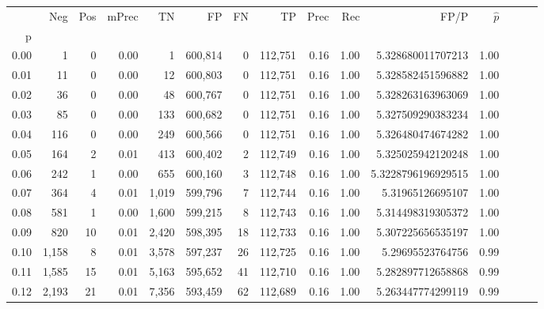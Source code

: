 \begin{tabular}{rrrrrrrrrrrrrrr}
\toprule
{} &     Neg &    Pos & mPrec &       TN &       FP &       FN &       TP &  Prec &   Rec &                    FP/P & $\hat{p}$ \\
p    &         &        &       &          &          &          &          &       &       &                         &           \\
\midrule
0.00 &       1 &      0 &  0.00 &        1 &  600,814 &        0 &  112,751 &  0.16 &  1.00 &       5.328680011707213 &      1.00 \\
0.01 &      11 &      0 &  0.00 &       12 &  600,803 &        0 &  112,751 &  0.16 &  1.00 &       5.328582451596882 &      1.00 \\
0.02 &      36 &      0 &  0.00 &       48 &  600,767 &        0 &  112,751 &  0.16 &  1.00 &       5.328263163963069 &      1.00 \\
0.03 &      85 &      0 &  0.00 &      133 &  600,682 &        0 &  112,751 &  0.16 &  1.00 &       5.327509290383234 &      1.00 \\
0.04 &     116 &      0 &  0.00 &      249 &  600,566 &        0 &  112,751 &  0.16 &  1.00 &       5.326480474674282 &      1.00 \\
0.05 &     164 &      2 &  0.01 &      413 &  600,402 &        2 &  112,749 &  0.16 &  1.00 &       5.325025942120248 &      1.00 \\
0.06 &     242 &      1 &  0.00 &      655 &  600,160 &        3 &  112,748 &  0.16 &  1.00 &      5.3228796196929515 &      1.00 \\
0.07 &     364 &      4 &  0.01 &    1,019 &  599,796 &        7 &  112,744 &  0.16 &  1.00 &        5.31965126695107 &      1.00 \\
0.08 &     581 &      1 &  0.00 &    1,600 &  599,215 &        8 &  112,743 &  0.16 &  1.00 &       5.314498319305372 &      1.00 \\
0.09 &     820 &     10 &  0.01 &    2,420 &  598,395 &       18 &  112,733 &  0.16 &  1.00 &       5.307225656535197 &      1.00 \\
0.10 &   1,158 &      8 &  0.01 &    3,578 &  597,237 &       26 &  112,725 &  0.16 &  1.00 &        5.29695523764756 &      0.99 \\
0.11 &   1,585 &     15 &  0.01 &    5,163 &  595,652 &       41 &  112,710 &  0.16 &  1.00 &       5.282897712658868 &      0.99 \\
0.12 &   2,193 &     21 &  0.01 &    7,356 &  593,459 &       62 &  112,689 &  0.16 &  1.00 &       5.263447774299119 &      0.99 \\

\end{tabular}
